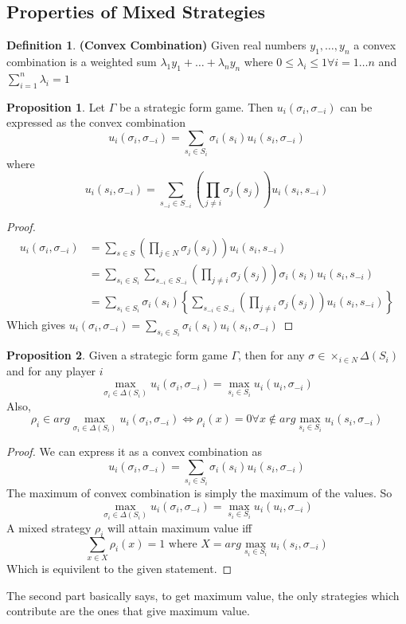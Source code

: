 \documentclass{article}
\theoremstyle{definition}
\newtheorem{defn}{Definition}[section]
\newtheorem{prop}{Proposition}[section]
\begin{document}
\subsection{Properties of Mixed Strategies}
\begin{defn}
\textbf{(Convex Combination)} Given real numbers $y_1, \dots, y_n$ a convex combination is a weighted sum $\lambda_1y_1 +\dots + \lambda_ny_n$ where $0\leq\lambda_i\leq1 \forall i = 1\dots n$ and $\sum_{i=1}^n \lambda_i = 1$
\end{defn}
\begin{prop}
\label{convex}
Let $\Gamma$ be a strategic form game. Then $u_i(\sigma_i,\sigma_{-i})$ can be expressed as the convex combination $$u_i(\sigma_i,\sigma_{-i}) = \sum_{s_i \in S_i} \sigma_i(s_i)u_i(s_i, \sigma_{-i})$$ where $$u_i(s_i, \sigma_{-i}) = \sum_{s_{-i}\in S_{-i}}\left(\prod_{j\neq i}\sigma_j(s_j)\right)u_i(s_i,s_{-i})$$
\end{prop}
\begin{proof}
\begin{align*}
u_i(\sigma_i,\sigma_{-i}) & = \sum_{s\in S} \left(\prod_{j\in N}\sigma_j(s_j)\right) u_i(s_i,s_{-i})\\
& = \sum_{s_i\in S_i} \sum_{s_{-i}\in S_{-i}} \left(\prod_{j\neq i}\sigma_j(s_j)\right)\sigma_i(s_i) u_i(s_i, s_{-i})\\
& = \sum_{s_i \in S_i} \sigma_i(s_i)\left\{ \sum_{s_{-i}\in S_{-i}}\left(\prod_{j\neq i}\sigma_j(s_j)\right)u_i(s_i,s_{-i})\right\}
\end{align*}
Which gives $u_i(\sigma_i,\sigma_{-i}) = \sum_{s_i \in S_i} \sigma_i(s_i)u_i(s_i, \sigma_{-i})$
\end{proof}
\begin{prop}
\label{maximum}
Given a strategic form game $\Gamma$, then for any $\sigma \in \times_{i\in N} \Delta(S_i)$ and for any player $i$ $$\max_{\sigma_i\in \Delta(S_i)} u_i(\sigma_i, \sigma_{-i}) = \max_{s_i \in S_i} u_i(u_i, \sigma_{-i})$$ Also, $$\rho_i \in arg \max_{\sigma_i \in \Delta(S_i)}u_i(\sigma_i,\sigma_{-i}) \iff \rho_i(x) = 0 \forall x\notin arg \max_{s_i\in S_i} u_i(s_i,\sigma_{-i})$$
\end{prop}
\begin{proof}
We can express it as a convex combination as $$u_i(\sigma_i,\sigma_{-i}) = \sum_{s_i \in S_i} \sigma_i(s_i)u_i(s_i, \sigma_{-i})$$ The maximum of convex combination is simply the maximum of the values. So $$\max_{\sigma_i\in \Delta(S_i)} u_i(\sigma_i, \sigma_{-i}) = \max_{s_i \in S_i} u_i(u_i, \sigma_{-i})$$ A mixed strategy $\rho_i$ will attain maximum value iff $$\sum_{x\in X} \rho_i(x) = 1 \text{ where } X = arg \max_{s_i\in S_i} u_i(s_i, \sigma_{-i})$$ Which is equivilent to the given statement.
\end{proof}
The second part basically says, to get maximum value, the only strategies which contribute are the ones that give maximum value.
\end{document}
